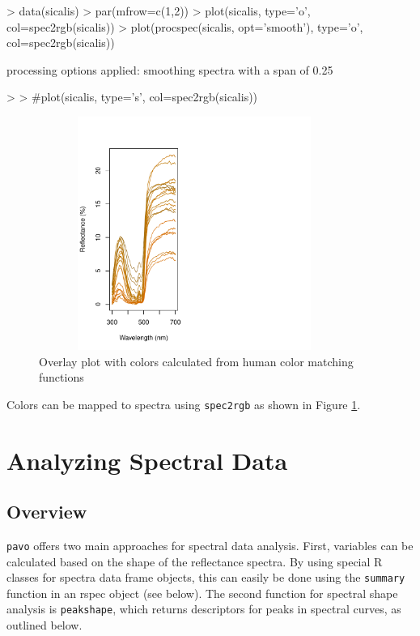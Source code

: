 \documentclass{article}
\newcommand{\pavo}{{\tt pavo}}  %
\newcommand{\code}[1]{{\tt #1}}  %
\begin{document}
\begin{Schunk}
\begin{Sinput}
> data(sicalis)
> par(mfrow=c(1,2))
> plot(sicalis, type='o', col=spec2rgb(sicalis))
> plot(procspec(sicalis, opt='smooth'), type='o', col=spec2rgb(sicalis))
\end{Sinput}
\begin{Soutput}
processing options applied:
 smoothing spectra with a span of 0.25 
\end{Soutput}
\begin{Sinput}
> 
> #plot(sicalis, type='s', col=spec2rgb(sicalis))
\end{Sinput}
\end{Schunk}



\begin{figure} %
\begin{center}
\includegraphics[width=4in, height=3in]{pavo-overlay}
\end{center}
\caption{Overlay plot with colors calculated from human color matching functions}
\label{figure:overlay}
\end{figure}

Colors can be mapped to spectra using \code{spec2rgb} as shown in 
Figure \ref{figure:overlay}.


\section{Analyzing Spectral Data}

\subsection{Overview}

\pavo{} offers two main approaches for spectral data analysis. First, variables can be 
calculated based on the shape of the reflectance spectra. By using special R classes for spectra 
data frame objects, this can easily be done using the \code{summary} function in an rspec 
object (see below). The second function for spectral shape analysis is \code{peakshape}, which returns descriptors for peaks in spectral curves, as outlined below.
\end{document}

